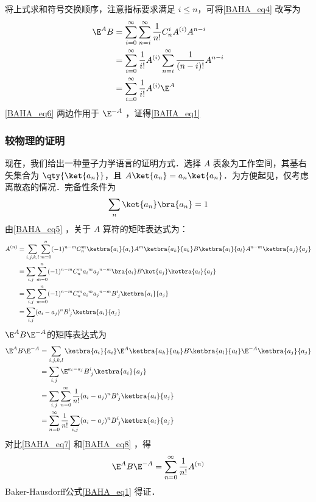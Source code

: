 将上式求和符号交换顺序，注意指标要求满足 $i\leq n$，可将\autoref{BAHA_eq4} 改写为
\begin{equation}\label{BAHA_eq6}
\begin{aligned}
\E^A B&=\sum_{i=0}^{\infty}\sum_{n=i}^{\infty}\frac{1}{n!}C_{n}^iA^{(i)}A^{n-i}\\
&=\sum_{i=0}^{\infty}\frac{1}{i!}A^{(i)}\sum_{n=i}^{\infty}\frac{1}{(n-i)!}A^{n-i}\\
&=\sum_{i=0}^{\infty}\frac{1}{i!}A^{(i)}\E^A
\end{aligned}
\end{equation}
\autoref{BAHA_eq6} 两边作用于 $\E^{-A}$ ，证得\autoref{BAHA_eq1} 

\subsubsection{较物理的证明}
现在，我们给出一种量子力学语言的证明方式．选择 $A$ 表象为工作空间，其基右矢集合为 $\qty{\ket{a_n}}$，且 $A\ket{a_n}=a_n\ket{a_n}$．为方便起见，仅考虑离散态的情况．完备性条件为
\begin{equation}
\sum_{n}\ket{a_n}\bra{a_n}=1
\end{equation}
由\autoref{BAHA_eq5} ，关于 $A$ 算符的矩阵表达式为：
\begin{equation}\label{BAHA_eq7}
\begin{aligned}
A^{(n)}&=\sum_{i,j,k,l}\sum_{m=0}^{n}(-1)^{n-m}C_{n}^{m}\ketbra{a_i}{a_i}A^m\ketbra{a_k}{a_k}B\ketbra{a_l}{a_l}A^{n-m}\ketbra{a_j}{a_j}\\
&=\sum_{i,j}\sum_{m=0}^{n}(-1)^{n-m}C_n^m{a_i}^m{a_j}^{n-m}\bra{a_i}B\ket{a_j}\ketbra{a_i}{a_j}\\
&=\sum_{i,j}\sum_{m=0}^{n}(-1)^{n-m}C_n^m{a_i}^m{a_j}^{n-m}B^i_{\; j}\ketbra{a_i}{a_j}\\
&=\sum_{i,j}(a_i-a_j)^nB^i_{\; j}\ketbra{a_i}{a_j}
\end{aligned}
\end{equation}
$\E^{A}B\E^{-A}$的矩阵表达式为
\begin{equation}\label{BAHA_eq8}
\begin{aligned}
\E^{A}B\E^{-A}&=\sum_{i,j,k,l}\ketbra{a_i}{a_i}\E^{A}\ketbra{a_k}{a_k}B\ketbra{a_l}{a_l}\E^{-A}\ketbra{a_j}{a_j}\\
&=\sum_{i,j}\E^{a_i-a_j}B^{i}_{\;j}\ketbra{a_i}{a_j}\\
&=\sum_{i,j}\sum_{n=0}^{\infty}\frac{1}{n!}(a_i-a_j)^nB^{i}_{\;j}\ketbra{a_i}{a_j}\\
&=\sum_{n=0}^{\infty}\frac{1}{n!}\sum_{i,j}(a_i-a_j)^nB^{i}_{\;j}\ketbra{a_i}{a_j}
\end{aligned}
\end{equation}
对比\autoref{BAHA_eq7} 和\autoref{BAHA_eq8} ，得
\begin{equation}
\E^{A}B\E^{-A}=\sum_{n=0}^{\infty}\frac{1}{n!}A^{(n)}
\end{equation}
Baker-Hausdorff公式\autoref{BAHA_eq1} 得证．


